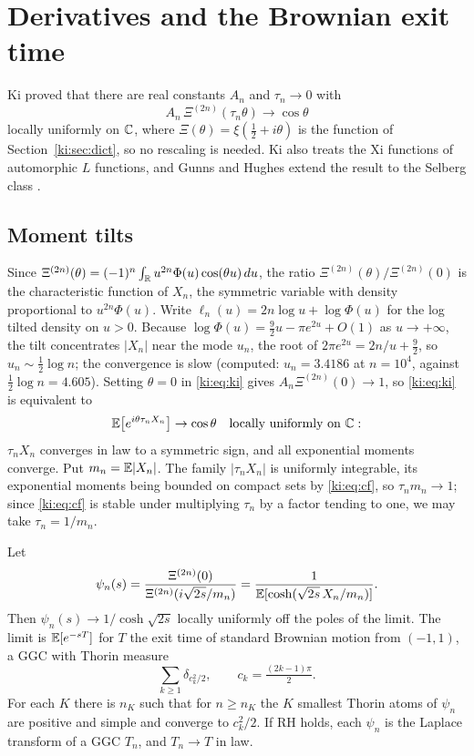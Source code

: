 \section{Derivatives and the Brownian exit time}\label{ki:sec:deriv}

Ki proved \cite{Ki06b} that there are real constants $A_n$ and $\tau_n\to0$ with
\begin{equation}\label{ki:eq:ki}
A_n\,\Xi^{(2n)}(\tau_n\theta)\to\cos\theta
\end{equation}
locally uniformly on $\mathbb{C}$, where $\Xi(\theta)=\xi(\tfrac12+i\theta)$ is the function of Section~\ref{ki:sec:dict}, so no rescaling is needed. Ki also treats the Xi functions of automorphic $L$ functions, and Gunns and Hughes extend the result to the Selberg class \cite{GunnsHughes19}. %


\subsection{Moment tilts}\label{ki:sec:moment}

Since $\Xi^{(2n)}(\theta)=(-1)^n\int_{\mathbb{R}}u^{2n}\Phi(u)\cos(\theta u)\,du$, the ratio $\Xi^{(2n)}(\theta)/\Xi^{(2n)}(0)$ is the characteristic function of $X_n$, the symmetric variable with density proportional to $u^{2n}\Phi(u)$. Write $\ell_n(u)=2n\log u+\log\Phi(u)$ for the log tilted density on $u>0$. Because $\log\Phi(u)=\tfrac92u-\pi e^{2u}+O(1)$ as $u\to+\infty$, the tilt concentrates $|X_n|$ near the mode $u_n$, the root of $2\pi e^{2u}=2n/u+\tfrac92$, so $u_n\sim\tfrac12\log n$; the convergence is slow (computed: $u_n=3.4186$ at $n=10^4$, against $\tfrac12\log n=4.605$). Setting $\theta=0$ in \eqref{ki:eq:ki} gives $A_n\Xi^{(2n)}(0)\to1$, so \eqref{ki:eq:ki} is equivalent to
\begin{equation}\label{ki:eq:cf}
\mathbb{E}\bigl[e^{i\theta\tau_nX_n}\bigr]\to\cos\theta\quad\text{locally uniformly on }\mathbb{C}:
\end{equation}
$\tau_nX_n$ converges in law to a symmetric sign, and all exponential moments converge. Put $m_n=\mathbb{E}|X_n|$. The family $|\tau_nX_n|$ is uniformly integrable, its exponential moments being bounded on compact sets by \eqref{ki:eq:cf}, so $\tau_nm_n\to1$; since \eqref{ki:eq:cf} is stable under multiplying $\tau_n$ by a factor tending to one, we may take $\tau_n=1/m_n$.

\begin{proposition}\label{ki:prop:bm}
Let
\[
\psi_n(s)=\frac{\Xi^{(2n)}(0)}{\Xi^{(2n)}(i\sqrt{2s}/m_n)}=\frac{1}{\mathbb{E}[\cosh(\sqrt{2s}\,X_n/m_n)]}.
\]
Then $\psi_n(s)\to1/\cosh\sqrt{2s}$ locally uniformly off the poles of the limit. The limit is $\mathbb{E}[e^{-sT}]$ for $T$ the exit time of standard Brownian motion from $(-1,1)$, a GGC with Thorin measure
\[
\sum_{k\ge1}\delta_{c_k^2/2},\qquad c_k=\tfrac{(2k-1)\pi}{2}.
\]
For each $K$ there is $n_K$ such that for $n\ge n_K$ the $K$ smallest Thorin atoms of $\psi_n$ are positive and simple and converge to $c_k^2/2$. If RH holds, each $\psi_n$ is the Laplace transform of a GGC $T_n$, and $T_n\to T$ in law.
\end{proposition}

